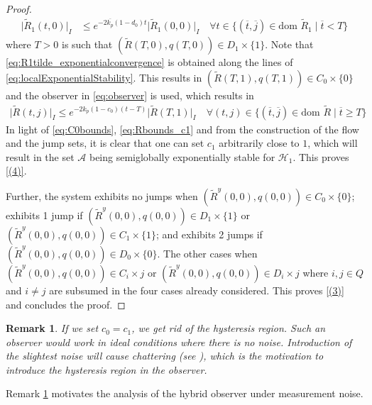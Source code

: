 \documentclass{article}
\newcommand{\dom}{\text{dom }}
\newtheorem{remark}{Remark}
\newcommand{\Rtilde}{\tilde{R}}
\newcommand{\normSOthree}[1]{{{\vert}#1 {\vert}_I}}
\newcommand{\expo}[1]{e^{#1}}
\newcommand{\A}{\mathcal{A}}
\begin{document}
\begin{proof}
\begin{align}\label{eq:R1tilde_exponentialconvergence}
    \normSOthree{\Rtilde_1(t,0)} &\leq \expo{-2\overline{k_p}(1-d_0)t}\normSOthree{\Rtilde_1(0,0)} \quad \forall t \in \{(\overline{t}, \overline{j}) \in \dom \Rtilde_1 \mid \overline{t} < T\}
\end{align}
where $T > 0$ is such that $(\Rtilde(T,0), q(T,0))\in D_1\times \{1\}$. Note that \eqref{eq:R1tilde_exponentialconvergence} is obtained along the lines of \eqref{eq:localExponentialStability}. This results in $(\Rtilde(T,1), q(T,1))\in C_0\times\{0\}$ and the observer in \eqref{eq:observer} is used, which results in 
\begin{align}\label{eq:Rbounds_c1}
    \normSOthree{\Rtilde(t,j)} \leq \expo{-2k_p(1-c_0)(t-T)}\normSOthree{\Rtilde(T,1)} \quad \forall (t,j)\in\{(\overline{t}, \overline{j}) \in \dom\Rtilde \mid \overline{t} \geq T\}
\end{align}
In light of \eqref{eq:C0bounds}, \eqref{eq:Rbounds_c1} and from the construction of the flow and the jump sets, it is clear that one can set $c_1$ arbitrarily close to $1$, which will result in the set $\A$ being semiglobally exponentially stable for $\mathcal{H}_1$. This proves \eqref{(4)}. 

Further, the system exhibits no jumps when ${(\Rtilde^y(0,0), q(0,0))}\in C_0\times\{0\}$; exhibits 1 jump if ${(\Rtilde^y(0,0), q(0,0))}\in D_1\times\{1\}$ or ${(\Rtilde^y(0,0), q(0,0))}\in C_1\times\{1\}$; and exhibits 2 jumps if ${(\Rtilde^y(0,0), q(0,0))}\in D_0\times\{0\}$. The other cases when $(\Rtilde^y(0,0), q(0,0))\in C_i\times j$ or $(\Rtilde^y(0,0), q(0,0))\in D_i\times j$ where $i,j\in Q$ and $i\neq j$ are subsumed in the four cases already considered. This proves \eqref{(3)} and concludes the proof. 
\end{proof}

\begin{remark}\label{remark:hysteresis}
    If we set $c_0 = c_1$, we get rid of the hysteresis region. Such an observer would work in ideal conditions where there is no noise. Introduction of the slightest noise will cause chattering (see \cite{quaternion-ricardo}), which is the motivation to introduce the hysteresis region in the observer. 
\end{remark}

\begin{flushleft}
Remark \ref{remark:hysteresis} motivates the analysis of the hybrid observer under measurement noise. 
\end{flushleft}
\end{document}
